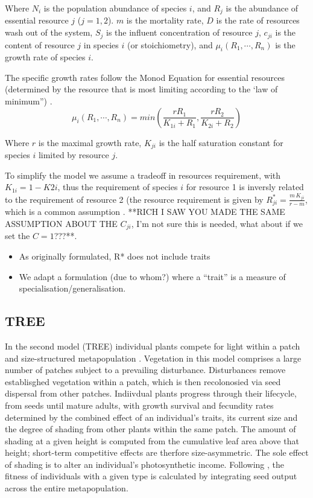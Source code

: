 \documentclass[a4paper,11pt]{article}
\begin{document}
Where $N_i$ is the population abundance of species $i$, and $R_j$ is the
abundance of essential resource $j$ ($j = 1, 2$). $m$ is the
mortality rate, $D$ is the rate of resources wash out of the system,
$S_j$ is the influent concentration of resource $j$, $c_{ji}$ is the
content of resource $j$ in species $i$ (or stoichiometry), and
$\mu_i(R_1, \cdots,  R_n)$ is the growth rate of species $i$.

The specific growth rates follow the Monod Equation for essential
resources (determined by the resource that is most limiting according
to the ‘law of minimum”)  \citep{Tilman-1977,Huisman-1999}.
\begin{equation}
\label{eq:R2}
\mu_i(R_1, \cdots,  R_n) = min \left( \frac{r R_1}{K_{1i} + R_1},  \frac{r R_2}{K_{2i} + R_2} \right)
\end{equation}

Where $r$ is the maximal growth rate, $K_{ji}$ is the
half saturation constant for species $i$ limited by resource $j$.

To simplify the model we assume a tradeoff in resources requirement, with $K_{1i} = 1-K{2i}$, thus the
requirement of species $i$ for resource 1 is inversly related to the
requirement of resource 2 (the resource requirement is given by
$R_{ji}^*=\frac{m \, K_{ji}}{r-m}$, which is a common assumption
\citep{Tilman-1985,Schreiber-2003,Fox-2008}. **RICH I SAW YOU MADE THE
SAME ASSUMPTION ABOUT THE $C_{ji}$, I'm not sure this is needed, what
about if we set the $C=1$???**.


\begin{itemize}
\item As originally formulated, R* does not include traits
\item We adapt a formulation (due to whom?) where a ``trait'' is a
  measure of specialisation/generalisation.
\end{itemize}

\subsection{TREE}

In the second model (TREE) individual plants compete for light within a patch
and size-structured metapopulation \citet{Falster-2011, Falster-2015}.
Vegetation in this model comprises a large number of patches subject to a
prevailing disturbance. Disturbances remove establisghed vegetation within a
patch, which is then recolonosied via seed dispersal from other patches.
Indiivdual plants progress through their lifecycle, from seeds until mature
adults, with growth survival and fecundity rates determined by the combined
effect of an individual's traits, its current size and the degree of shading
from other plants within the same patch. The amount of shading at a given
height is computed from the cumulative leaf area above that height; short-term
competitive effects are therfore size-asymmetric. The sole effect of shading
is to alter an individual's photosynthetic income. Following
\citep{Falster-2015}, the fitness of individuals with a given type is
calculated by integrating seed output across the entire metapopulation.
\end{document}
